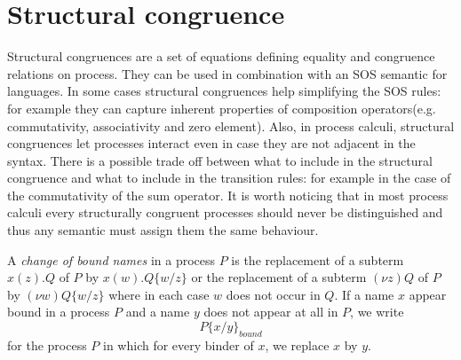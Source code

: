 




\section{Structural congruence}

Structural congruences are a set of equations defining equality and congruence relations on process. They can be used in combination with an SOS semantic for languages. In some cases structural congruences help simplifying the SOS rules: for example they can capture inherent properties of composition operators(e.g. commutativity, associativity and zero element). Also, in process calculi, structural congruences let processes interact even in case they are not adjacent in the syntax. There is a possible trade off between what to include in the structural congruence and what to include in the transition rules: for example in the case of the commutativity of the sum operator. It is worth noticing that in most process calculi every structurally congruent processes should never be distinguished and thus any semantic must assign them the same behaviour.


\begin{definition}
  A \emph{change of bound names} in a process $P$ is the replacement of a subterm $x(z).Q$ of $P$ by $x(w).Q\{w/z\}$ or the replacement of a subterm $(\nu z)Q$ of $P$ by $(\nu w)Q\{w/z\}$ where in each case $w$ does not occur in $Q$. If a name $x$ appear bound in a process $P$ and a name $y$ does not appear at all in $P$, we write 
  \[
    P\{x/y\}_{bound}
  \]
  for the process $P$ in which for every binder of $x$, we replace $x$ by $y$.
\end{definition}


